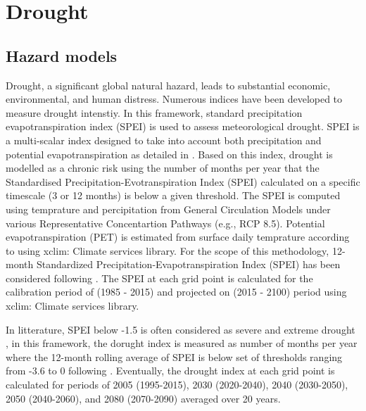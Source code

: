 \documentclass[a4paper,11pt]{extarticle} %
\theoremstyle{definition}
\begin{document}
\section{Drought}

\subsection{Hazard models}
Drought, a significant global natural hazard, leads to substantial economic, environmental, and human distress. Numerous indices have been developed to measure drought intenstiy. In this framework, standard precipitation evapotranspiration index (SPEI) is used to assess meteorological drought. SPEI is a multi-scalar index designed to take into account both precipitation and potential evapotranspiration as detailed in \cite{VicenteSerranoEtAl:2010,BegueriaEtAl:2014}. Based on this index, drought is modelled as a chronic risk using the number of months per year that the Standardised Precipitation-Evotranspiration Index (SPEI) calculated on a specific timescale (3 or 12 months) is below a given threshold.
The SPEI is computed using temprature and percipitation from General Circulation Models under various Representative Concentartion Pathways (e.g., RCP 8.5). Potential evapotranspiration (PET) is estimated from surface daily temprature according to \cite{TanguyEtAl:2018} using xclim: Climate services library. For the scope of this methodology, 12-month Standardized Precipitation-Evapotranspiration Index (SPEI) has been considered following \cite{MarziEtAl:2021,AriasEtAl:2020,PoljansekEtAl:2022}. The SPEI at each grid point is calculated for the calibration period of (1985 - 2015) and projected on (2015 - 2100) period using xclim: Climate services library.

In litterature, SPEI below -1.5 is often considered as severe and extreme drought \cite{SmirnovEtAl:2016}, in this framework, the dorught index is measured as number of months per year where the 12-month rolling average of SPEI is below  set of thresholds ranging from -3.6 to 0 following \cite{LuoEtAl:2021} . Eventually, the drought index at each grid point is calculated for periods of 2005 (1995-2015), 2030 (2020-2040), 2040 (2030-2050), 2050 (2040-2060), and 2080 (2070-2090) averaged over 20 years.

\end{document}
